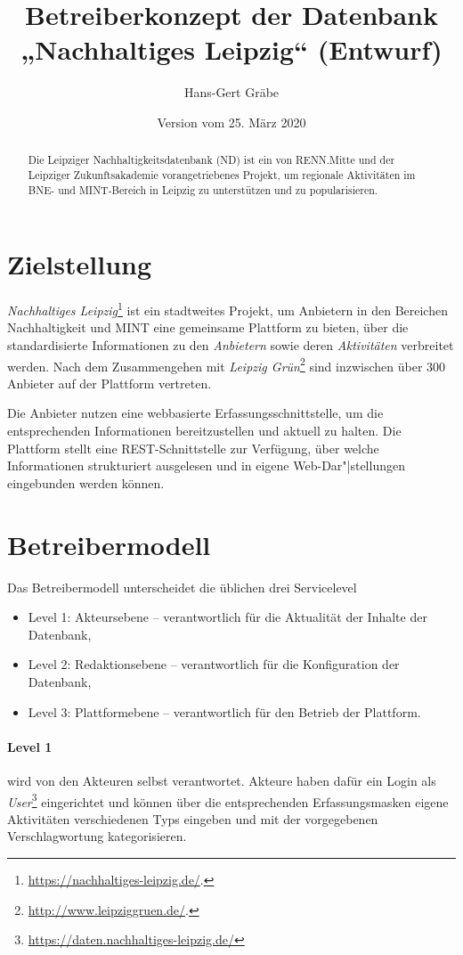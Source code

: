 \documentclass[a4paper,11pt]{article}
\title{Betreiberkonzept der Datenbank\\ „Nachhaltiges Leipzig“ (Entwurf)}
\author{Hans-Gert Gräbe}
\date{Version vom 25. März 2020}
\begin{document}
\maketitle
\begin{abstract}
  Die Leipziger Nachhaltigkeitsdatenbank (ND) ist ein von RENN.Mitte und der
  Leipziger Zukunftsakademie vorangetriebenes Projekt, um regionale
  Aktivitäten im BNE- und MINT-Bereich in Leipzig zu unterstützen und zu
  popularisieren.
\end{abstract}
\tableofcontents 
\newpage

\section{Zielstellung}

\emph{Nachhaltiges Leipzig}\footnote{\url{https://nachhaltiges-leipzig.de/}.}
ist ein stadtweites Projekt, um Anbietern in den Bereichen Nachhaltigkeit und
MINT eine gemeinsame Plattform zu bieten, über die standardisierte
Informationen zu den \emph{Anbietern} sowie deren \emph{Aktivitäten}
verbreitet werden.  Nach dem Zusammengehen mit \emph{Leipzig
  Grün}\footnote{\url{http://www.leipziggruen.de/}.} sind inzwischen über 300
Anbieter auf der Plattform vertreten. 

Die Anbieter nutzen eine webbasierte Erfassungsschnittstelle, um die
entsprechenden Informationen bereitzustellen und aktuell zu halten.  Die
Plattform stellt eine REST-Schnittstelle zur Verfügung, über welche
Informationen strukturiert ausgelesen und in eigene Web-Dar"|stellungen
eingebunden werden können.

\section{Betreibermodell}

Das Betreibermodell unterscheidet die üblichen drei Servicelevel
\begin{itemize}
\item Level 1: Akteursebene -- verantwortlich für die Aktualität der Inhalte
  der Datenbank,
\item Level 2: Redaktionsebene -- verantwortlich für die Konfiguration der
  Datenbank,
\item Level 3: Plattformebene -- verantwortlich für den Betrieb der
  Plattform. 
\end{itemize}
\paragraph{Level 1}
wird von den Akteuren selbst verantwortet. Akteure haben dafür ein Login als
\emph{User}\footnote{\url{https://daten.nachhaltiges-leipzig.de/}}
eingerichtet und können über die entsprechenden Erfassungsmasken eigene
Aktivitäten verschiedenen Typs eingeben und mit der vorgegebenen
Verschlagwortung kategorisieren.
\end{document}
